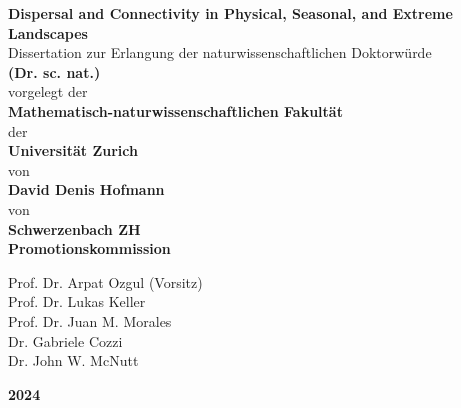 \documentclass[../FinalThesis.tex]{subfiles}
\begin{document}
\begin{titlepage}
\begin{center}

\vspace*{1.5cm}
\textbf{\LARGE Dispersal and Connectivity in Physical, Seasonal, and Extreme Landscapes}\\

\vspace{2cm}
Dissertation zur Erlangung der naturwissenschaftlichen Doktorwürde\\
\textbf{\large (Dr. sc. nat.)}\\

\vspace{1.0cm}
vorgelegt der\\
\textbf{\large Mathematisch-naturwissenschaftlichen Fakultät}\\
der\\
\textbf{\large Universität Zurich}\\

\vspace{1.0cm}
von\\
\textbf{\large David Denis Hofmann}\\
von\\
\textbf{\large Schwerzenbach ZH}\\

\vspace{2cm}
\textbf{\large Promotionskommission\\}
\vspace{0.2cm}
\begin{onehalfspacing}
Prof. Dr. Arpat Ozgul (Vorsitz)\\
Prof. Dr. Lukas Keller\\
Prof. Dr. Juan M. Morales\\
Dr. Gabriele Cozzi\\
Dr. John W. McNutt\\
\end{onehalfspacing}

\vfill
\textbf{\large 2024}

%

\end{center}
\end{titlepage}
\end{document}
